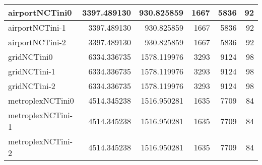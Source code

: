 \documentclass[../../../thesis.tex]{subfiles}
\begin{document}
\begin{longtable}{|l|r|r|r|r|r|}
airportNCTini0 & 3397.489130 & 930.825859 & 1667 & 5836 & 92 \\ \hline
airportNCTini-1 & 3397.489130 & 930.825859 & 1667 & 5836 & 92 \\ \hline
airportNCTini-2 & 3397.489130 & 930.825859 & 1667 & 5836 & 92 \\ \hline
gridNCTini0 & 6334.336735 & 1578.119976 & 3293 & 9124 & 98 \\ \hline
gridNCTini-1 & 6334.336735 & 1578.119976 & 3293 & 9124 & 98 \\ \hline
gridNCTini-2 & 6334.336735 & 1578.119976 & 3293 & 9124 & 98 \\ \hline
metroplexNCTini0 & 4514.345238 & 1516.950281 & 1635 & 7709 & 84 \\ \hline
metroplexNCTini-1 & 4514.345238 & 1516.950281 & 1635 & 7709 & 84 \\ \hline
metroplexNCTini-2 & 4514.345238 & 1516.950281 & 1635 & 7709 & 84 \\ \hline
\end{longtable}
\end{document}
